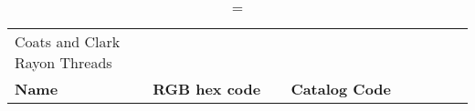 
\begin{longtable}{p{0.3\linewidth} p{0.3\linewidth} p{0.4\linewidth}}
\caption = {Coats and Clark Rayon Threads}
\label{tblr:coatsrayon}\\
\textbf{Name} & \textbf{RGB hex code} & \textbf{Catalog Code} \\

\end{longtable}
